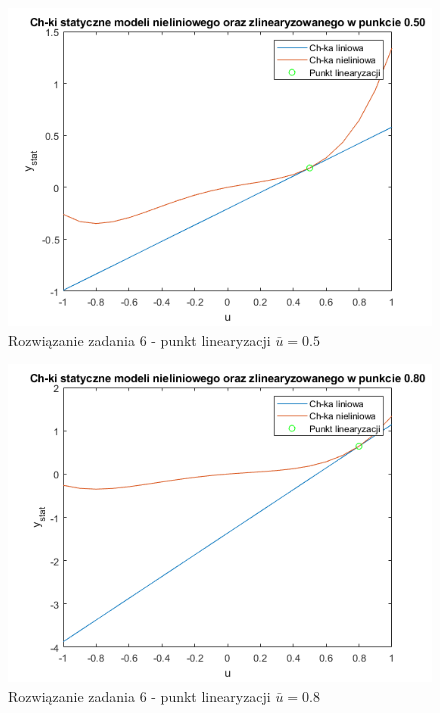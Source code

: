 \begin{figure}[H]
\centering
\includegraphics[width=15cm]{images/8.png}
\caption{Rozwiązanie zadania 6 - punkt linearyzacji $\bar{u}=0.5$}
\label{fig:8}
\end{figure}
\begin{figure}[H]
\centering
\includegraphics[width=15cm]{images/9.png}
\caption{Rozwiązanie zadania 6 - punkt linearyzacji $\bar{u}=0.8$}
\label{fig:9}
\end{figure}
